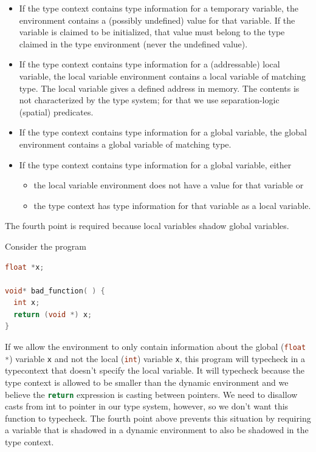 \documentclass{puthesis}
\begin{document}
\begin{itemize}
\item If the type context contains type information for a temporary
  variable, the environment contains a (possibly undefined) value for
  that variable. If the variable is claimed to be initialized, that
  value must belong to the type claimed in the type environment (never
  the undefined value).
\item If the type context contains type information for a
  (addressable) local variable, the local variable environment
  contains a local variable of matching type. The local variable gives
  a defined address in memory.  The contents is not characterized by
  the type system; for that we use separation-logic (spatial)
  predicates.
\item If the type context contains type information for a global
  variable, the global environment contains a global variable of
  matching type. 
\item If the type context contains type information for a global
  variable, either
  \begin{itemize}
  \item the local variable environment does not have a value for that
    variable or
  \item the type context has type information for that variable as a
    local variable.
  \end{itemize}
\end{itemize}

\noindent The fourth point is required because local variables shadow global
variables.

Consider the program

\begin{lstlisting}[language = c]
float *x; 

void* bad_function( ) {
  int x;
  return (void *) x;
}
\end{lstlisting}

If we allow the environment to only contain information about the global
(\lstinline[language=c]|float *|) variable \lstinline|x| and not the
local (\lstinline[language=c]|int|) variable \lstinline|x|, this
program will typecheck in a typecontext that doesn't specify the local
variable. It will typecheck because the type context is allowed
to be smaller than the dynamic environment and we believe the
\lstinline[language=c]|return| expression is casting between pointers.
We need to disallow casts from int to pointer in our
type system, however, so we don't want this function to typecheck. The fourth
point above prevents this situation by requiring a variable that is shadowed in
a dynamic environment to also be shadowed in the type context.
\end{document}
